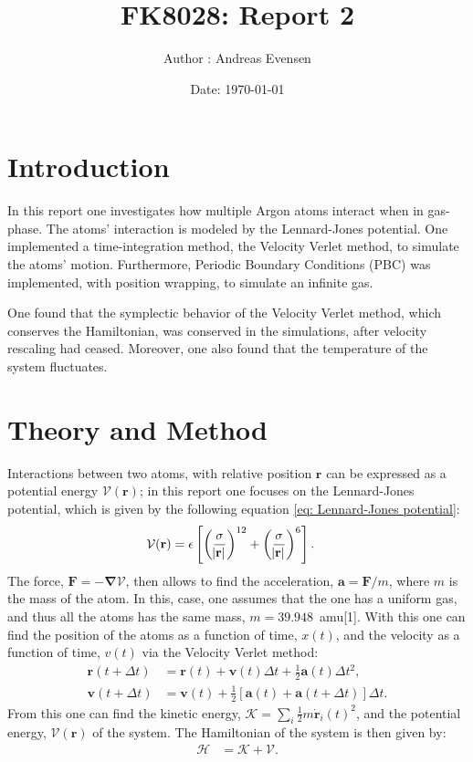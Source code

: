 \documentclass[a4paper]{article}
\title{FK8028: Report 2}
\author{Author : Andreas Evensen}
\date{Date: \today}
\newcommand{\grad}{\mathbf{\nabla}}
\newcommand{\newparagraph}{\vspace{.5cm}\noindent}
\begin{document}

\newpage
{}
\setcounter{page}{1}
\newpage
\tableofcontents
\newpage
{}
\section{Introduction}
In this report one investigates how multiple Argon atoms interact when in gas-phase. The atoms' interaction is modeled by the Lennard-Jones potential.
One implemented a time-integration method, the Velocity Verlet method, to simulate the atoms' motion.
Furthermore, Periodic Boundary Conditions (PBC) was implemented, with position wrapping, to simulate an infinite gas.

\newparagraph
One found that the symplectic behavior of the Velocity Verlet method, which conserves the Hamiltonian, was conserved in the simulations, after velocity rescaling had ceased. Moreover, one also found that the temperature of the system fluctuates.
\section{Theory and Method}
Interactions between two atoms, with relative position $\mathbf{r}$ can be expressed as a potential energy $\mathcal{V}(\mathbf{r})$; in this report one focuses on the Lennard-Jones potential, which is given by the following equation \eqref{eq: Lennard-Jones potential}:
\begin{align}
    \mathcal{V}(\mathbf{r}) &= \epsilon\left[\left(\frac{\sigma}{\abs{\mathbf{r}}}\right)^{12} + \left(\frac{\sigma}{\abs{\mathbf{r}}}\right)^6\right].\label{eq: Lennard-Jones potential}
\end{align}The force, $\mathbf{F} = -\grad \mathcal{V}$, then allows to find the acceleration, $\mathbf{a} = \mathbf{F}/m$, where $m$ is the mass of the atom. In this, case, one assumes that the one has a uniform gas, and thus all the atoms has the same mass, $m = 39.948$~amu[1].
With this one can find the position of the atoms as a function of time, $x(t)$, and the velocity as a function of time, $v(t)$ via the Velocity Verlet method:
\begin{align*}
    \mathbf{r}(t + \Delta t) &= \mathbf{r}(t) + \mathbf{v}(t)\Delta t + \frac{1}{2}\mathbf{a}(t)\Delta t^2,\\
    \mathbf{v}(t + \Delta t) &= \mathbf{v}(t) + \frac{1}{2}\left[\mathbf{a}(t) + \mathbf{a}(t + \Delta t)\right]\Delta t.
\end{align*}From this one can find the kinetic energy, $\mathcal{K} = \sum_i \frac{1}{2}m\dot{\mathbf{r}}_i(t)^2$, and the potential energy, $\mathcal{V}(\mathbf{r})$ of the system. The Hamiltonian of the system is then given by:
\begin{align*}
    \mathcal{H} &= \mathcal{K} + \mathcal{V}.
\end{align*}
\end{document}
